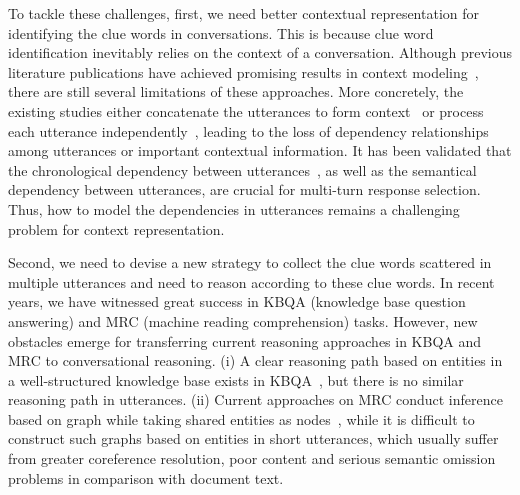 \documentclass[letterpaper]{article} %
\begin{document}
To tackle these challenges, first, we need better contextual representation for identifying the clue words in conversations. This is because clue word identification inevitably relies on the context of a conversation. Although previous literature publications have achieved promising results in context modeling~\cite{Tao2019,qu2019bert,su2019improving}, there are still several limitations of these approaches. More concretely, the existing studies either concatenate the utterances to form context~\cite{su2019improving} or process each utterance independently~\cite{Tao2020,Lu2020}, leading to the loss of dependency relationships among utterances or important contextual information. It has been validated that the chronological dependency between utterances~\cite{Lu2020,yeh2019flowdelta}, as well as the semantical dependency between utterances, are crucial for multi-turn response selection. Thus, how to model the dependencies in utterances remains a challenging problem for context representation.

Second, we need to devise a new strategy to collect the clue words scattered in multiple utterances and need to reason according to these clue words. In recent years, we have witnessed great success in KBQA (knowledge base question answering) and MRC (machine reading comprehension) tasks. However, new obstacles emerge for transferring current reasoning approaches in KBQA and MRC to conversational reasoning. (i) A clear reasoning path based on entities in a well-structured knowledge base exists in KBQA~\cite{2017Variational,xu2019enhancing}, but there is no similar reasoning path in utterances. (ii) Current approaches on MRC conduct inference based on graph while taking shared entities as nodes~\cite{Fang2019,Qiu2020,Martin}, while it is difficult to construct such graphs based on entities in short utterances, which usually suffer from greater coreference resolution, poor content and serious semantic omission problems in comparison with document text.
\end{document}
